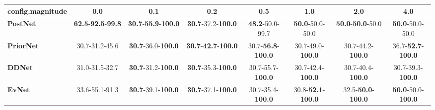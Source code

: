 \begin{tabular}{lccccccc}
\toprule
\textbf{config.magnitude} &                                        0.0 &                                         0.1 &                                         0.2 &                                0.5 &                                1.0 &                                2.0 &                                4.0 \\
\midrule
\textbf{PostNet } &  \textbf{62.5}-\textbf{92.5}-\textbf{99.8} &  \textbf{30.7}-\textbf{55.9}-\textbf{100.0} &           \textbf{30.7}-37.2-\textbf{100.0} &            \textbf{48.2}-50.0-99.7 &            \textbf{50.0}-50.0-50.0 &   \textbf{50.0}-\textbf{50.0}-50.0 &            \textbf{50.0}-50.0-50.0 \\
\textbf{PriorNet} &                             30.7-31.2-45.6 &           \textbf{30.7}-36.0-\textbf{100.0} &  \textbf{30.7}-\textbf{42.7}-\textbf{100.0} &  30.7-\textbf{56.8}-\textbf{100.0} &           30.7-49.0-\textbf{100.0} &           30.7-44.2-\textbf{100.0} &  36.7-\textbf{52.7}-\textbf{100.0} \\
\textbf{DDNet   } &                             31.0-31.5-32.7 &           \textbf{30.7}-31.2-\textbf{100.0} &           \textbf{30.7}-35.3-\textbf{100.0} &           30.7-55.7-\textbf{100.0} &           30.7-42.4-\textbf{100.0} &           30.7-40.4-\textbf{100.0} &           30.7-39.3-\textbf{100.0} \\
\textbf{EvNet   } &                             33.6-55.1-91.3 &           \textbf{30.7}-39.1-\textbf{100.0} &           \textbf{30.7}-37.1-\textbf{100.0} &           30.7-35.4-\textbf{100.0} &  30.8-\textbf{52.1}-\textbf{100.0} &  32.5-\textbf{50.0}-\textbf{100.0} &  \textbf{50.0}-50.0-\textbf{100.0} \\
\bottomrule
\end{tabular}
